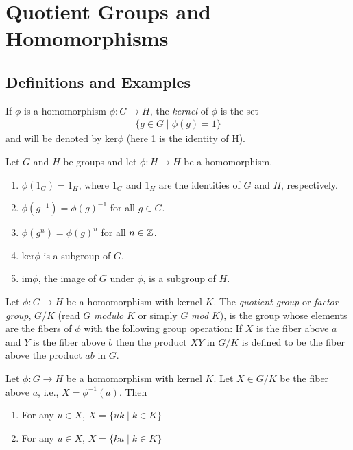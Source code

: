 \documentclass[../main]{subfiles}
\begin{document}
 
 \section{Quotient Groups and Homomorphisms}
 
 
 \subsection{Definitions and Examples}
 

 \begin{dfn}
  If $\phi$ is a homomorphism $\phi \colon G \to H$, the \textit{kernel} of $\phi$ is the set
  \begin{align*}
   \{g\in G \mid \phi(g)= 1\}
  \end{align*}
  and will be denoted by ker$\phi$ (here 1 is the identity of H).
 \end{dfn}

 
 \begin{prop}
  Let $G$ and $H$ be groups and let $\phi \colon H \to H$ be a homomorphism.
  \begin{enumerate}
   \item $\phi(1_G)=1_H$, where $1_G$ and $1_H$ are the identities of $G$ and $H$, respectively.
   \item $\phi(g^{-1})=\phi(g)^{-1}$ for all $g\in G$.
   \item $\phi(g^n)=\phi(g)^n$ for all $n\in \mathbb{Z}$.
   \item ker$\phi$ is a subgroup of $G$.
   \item im$\phi$, the image of $G$ under $\phi$, is a subgroup of $H$.
  \end{enumerate}
 \end{prop}

 
 \begin{dfn}
  Let $\phi \colon G\to H$ be a homomorphism with kernel $K$. The \textit{quotient group} or \textit{factor group}, $G/K$ (read $G$ \textit{modulo} $K$ or simply $G$ \textit{mod} $K$), is the group whose elements are the fibers of $\phi$ with the following group operation: If $X$ is the fiber above $a$ and $Y$ is the fiber above $b$ then the product $XY$ in $G/K$ is defined to be the fiber above the product $ab$ in $G$.
 \end{dfn}

 
 \begin{prop}
  Let $\phi \colon G \to H$ be a homomorphism with kernel $K$. Let $X\in G/K$ be the fiber above $a$, i.e., $X=\phi^{-1}(a)$. Then 
  \begin{enumerate}
   \item For any $u\in X$,  $X=\{uk\mid k\in K\}$
   \item For any $u\in X$,  $X=\{ku\mid k\in K\}$
  \end{enumerate}
 \end{prop}
 
\end{document}
